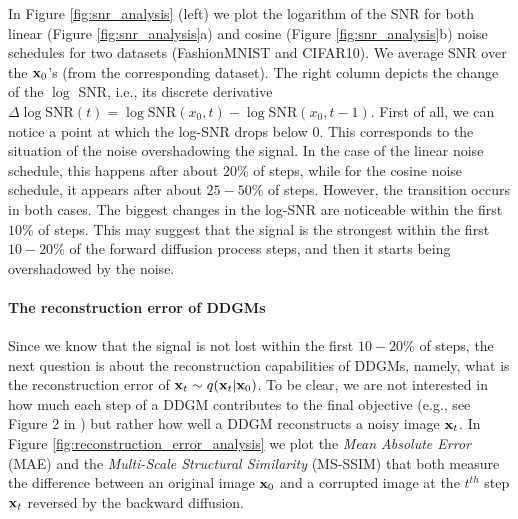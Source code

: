 In Figure \ref{fig:snr_analysis} (left) we plot the logarithm of the SNR for both linear (Figure \ref{fig:snr_analysis}a) and cosine (Figure \ref{fig:snr_analysis}b) noise schedules for two datasets (FashionMNIST and CIFAR10). We average SNR over the ${\mathbf{x}}_0$'s (from the corresponding dataset). The right column depicts the change of the $\log$ SNR, i.e., its discrete derivative $\Delta \log \text{SNR}(t) = \log \text{SNR}(x_0, t) - \log \text{SNR}(x_0, t-1)$. First of all, we can notice a point at which the log-SNR drops below $0$. This corresponds to the situation of the noise overshadowing the signal. In the case of the linear noise schedule, this happens after about $20\%$ of steps, while for the cosine noise schedule, it appears after about $25-50\%$ of steps. However, the transition occurs in both cases. The biggest changes in the log-SNR are noticeable within the first $10\%$ of steps. This may suggest that the signal is the strongest within the first $10-20\%$ of the forward diffusion process steps, and then it starts being overshadowed by the noise. 

\paragraph{The reconstruction error of DDGMs} Since we know that the signal is not lost within the first $10-20\%$ of steps, the next question is about the reconstruction capabilities of DDGMs, namely, what is the reconstruction error of ${\mathbf{x}}_t \sim q({\mathbf{x}}_t | {\mathbf{x}}_0)$. To be clear, we are not interested in how much each step of a DDGM contributes to the final objective (e.g., see Figure 2 in \citet{nichol2021improved}) but rather how well a DDGM reconstructs a noisy image ${\mathbf{x}}_t$.
In Figure \ref{fig:reconstruction_error_analysis} we plot the \textit{Mean Absolute Error} (MAE) and the \textit{Multi-Scale Structural Similarity} (MS-SSIM) \cite{wang2003multiscale} that both measure the difference between an original image ${\mathbf{x}}_0$ and a corrupted image at the $t^{th}$ step ${\mathbf{x}}_t$ reversed by the backward diffusion. 

